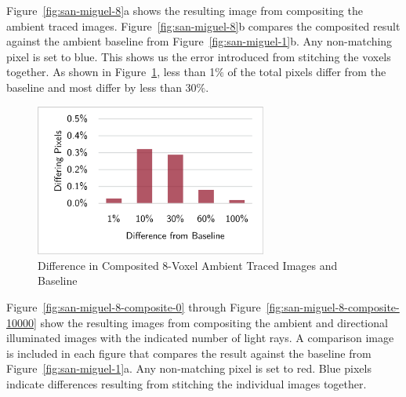 Figure~\ref{fig:san-miguel-8}a shows the resulting
image from compositing the ambient traced images. 
Figure~\ref{fig:san-miguel-8}b compares the composited result against the
ambient baseline from Figure~\ref{fig:san-miguel-1}b.  Any non-matching pixel
is set to blue.  This shows us the error introduced from stitching the voxels
together.  As shown in Figure~\ref{fig:ambient_error_graph}, less than 1$\%$
of the total pixels differ from the baseline and most differ by less than 30$\%$.

\begin{figure}[!htb]
\centering
\includegraphics[width=3in]{drawings/test_case/results/analysis/ErrorForAmbient.pdf}
\caption{Difference in Composited 8-Voxel Ambient Traced Images and Baseline}
\label{fig:ambient_error_graph}
\end{figure} 

Figure~\ref{fig:san-miguel-8-composite-0} through
Figure~\ref{fig:san-miguel-8-composite-10000} show the resulting images from
compositing the ambient and directional illuminated images with the indicated
number of light rays.  A comparison image is included in each figure that
compares the result against the baseline from Figure~\ref{fig:san-miguel-1}a. 
Any non-matching pixel is set to red.  Blue pixels indicate differences
resulting from stitching the individual images together.

